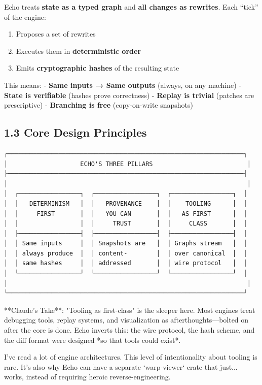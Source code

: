 \documentclass[
  11pt,
]{book}
\providecommand{\tightlist}{%
  \setlength{\itemsep}{0pt}\setlength{\parskip}{0pt}}
\begin{document}
Echo treats \textbf{state as a typed graph} and \textbf{all changes as
rewrites}. Each ``tick'' of the engine:

\begin{enumerate}
\def\labelenumi{\arabic{enumi}.}
\tightlist
\item
  Proposes a set of rewrites
\item
  Executes them in \textbf{deterministic order}
\item
  Emits \textbf{cryptographic hashes} of the resulting state
\end{enumerate}

This means: - \textbf{Same inputs → Same outputs} (always, on any
machine) - \textbf{State is verifiable} (hashes prove correctness) -
\textbf{Replay is trivial} (patches are prescriptive) -
\textbf{Branching is free} (copy-on-write snapshots)

\subsection{1.3 Core Design Principles}\label{core-design-principles}

\begin{verbatim}
┌─────────────────────────────────────────────────────────────────┐
│                    ECHO'S THREE PILLARS                          │
├─────────────────────────────────────────────────────────────────┤
│                                                                  │
│  ┌─────────────────┐  ┌─────────────────┐  ┌─────────────────┐  │
│  │   DETERMINISM   │  │   PROVENANCE    │  │    TOOLING      │  │
│  │     FIRST       │  │   YOU CAN       │  │   AS FIRST      │  │
│  │                 │  │     TRUST       │  │     CLASS       │  │
│  ├─────────────────┤  ├─────────────────┤  ├─────────────────┤  │
│  │ Same inputs     │  │ Snapshots are   │  │ Graphs stream   │  │
│  │ always produce  │  │ content-        │  │ over canonical  │  │
│  │ same hashes     │  │ addressed       │  │ wire protocol   │  │
│  └─────────────────┘  └─────────────────┘  └─────────────────┘  │
│                                                                  │
└─────────────────────────────────────────────────────────────────┘
\end{verbatim}

\begin{claudecommentary}
**Claude's Take**: "Tooling as first-class" is the sleeper here. Most engines treat debugging tools, replay systems, and visualization as afterthoughts—bolted on after the core is done. Echo inverts this: the wire protocol, the hash scheme, and the diff format were designed *so that tools could exist*.

I've read a lot of engine architectures. This level of intentionality about tooling is rare. It's also why Echo can have a separate `warp-viewer` crate that just... works, instead of requiring heroic reverse-engineering.
\end{claudecommentary}
\end{document}
